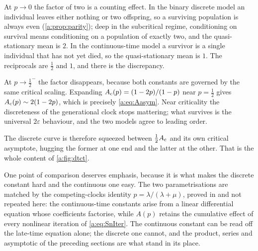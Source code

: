 At $p\to0$ the factor of two is a counting effect. In the binary discrete model an
individual leaves either nothing or two offspring, so a surviving population is
always even (\cref{a:prop:parity}); deep in the subcritical regime, conditioning on
survival means conditioning on a population of exactly two, and the
quasi-stationary mean is $2$. In the continuous-time model a survivor is a single
individual that has not yet died, so the quasi-stationary mean is $1$. The
reciprocals are $\tfrac12$ and $1$, and there is the discrepancy.

At $p\to\tfrac12^-$ the factor disappears, because both constants are governed by
the same critical scaling. Expanding $A_{\mathrm{c}}(p) = (1-2p)/(1-p)$ near $p=\tfrac12$
gives $A_{\mathrm{c}}(p)\sim2(1-2p)$, which is precisely \cref{a:eq:Aasym}. Near
criticality the discreteness of the generational clock stops mattering; what
survives is the universal $2\varepsilon$ behaviour, and the two models agree to
leading order.

The discrete curve is therefore squeezed between $\tfrac12A_{\mathrm{c}}$ and its own
critical asymptote, hugging the former at one end and the latter at the other.
That is the whole content of \cref{a:fig:dtct}.

One point of comparison deserves emphasis, because it is what makes the discrete
constant hard and the continuous one easy. The two parametrisations are matched by
the competing-clocks identity $p=\lambda/(\lambda+\mu)$, proved in \ChM{} and not
repeated here: the continuous-time constants arise from a linear differential
equation whose coefficients factorise, while $A(p)$ retains the cumulative effect
of every nonlinear iteration of \cref{a:eq:SnIter}. The continuous constant can be
read off the late-time equation alone; the discrete one cannot, and the product,
series and asymptotic of the preceding sections are what stand in its place.
